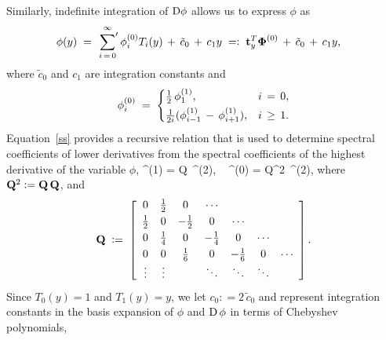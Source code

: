 \documentclass[%
secnumarabic,%
 amssymb, amsmath,%
 aps,prf,superscriptaddress,longbibliography
frontmatterverbose,
]{revtex4-2}
\newcommand{\DefinedAs}[0]{\mathrel{\mathop:}=}
\newcommand{\AsDefined}[0]{=\mathrel{\mathop:}}
\begin{document}
Similarly, indefinite integration of $\mathrm D \phi$ allows us to express $\phi$ as
	\begin{align*}
  	\phi (y) 
	\;&=\; 
	\sideset{}{'}\sum_{i \, = \, 0}^{\infty} 
	\phi_i^{(0)} T_i(y) \,+ \, \tilde{c}_0 \, + \,c_1 y
	 \; \AsDefined \;
	  \HH t_y^T \BB \Phi^{(0)} 
	  \,+\, 
	 \tilde{c}_0 \, + \,c_1 y,
\end{align*}
where $\tilde{c}_0$ and $c_1$ are integration constants and 
\begin{equation}
  \phi_i^{(0)} \;=\;
  \begin{cases}
    \tfrac{1}{2} \, \phi_1^{(1)}, & i \, = \, 0,
    \\[0.1cm]
  \tfrac{1}{2i} (\phi_{i-1}^{(1)}\,-\,\phi_{i+1}^{(1)}), &  i \, \geq \, 1.
  \end{cases}
  \nonumber
  \end{equation}
Equation~\eqref{ss} provides a recursive relation that is used to determine spectral coefficients of lower derivatives from the spectral coefficients of the highest derivative of the variable $\phi$,
	\be
	\BB \Phi^{(1)}
	\; = \;
	\HH Q \,\BB \Phi^{(2)},
	~
	\BB \Phi^{(0)}
	\; = \;
	\HH Q^2\, \BB \Phi^{(2)},
	\non
	\ee
where $\HH Q^2 \DefinedAs \HH Q\, \HH Q$, and
\begin{equation}\label{eq:Q}
  \HH Q \;\DefinedAs\; \left[\begin{array}{ccccccc}
     0& \tfrac{1}{2} & 0 & \cdots
     \\[0.1cm]
    \tfrac{1}{2} & 0 & -\tfrac{1}{2} & 0 &\cdots
    \\[0.1cm]
    0 & \tfrac{1}{4} & 0 & -\tfrac{1}{4} & 0 &\cdots 
    \\[0.1cm]
    0 & 0 & \tfrac{1}{6} & 0 & -\tfrac{1}{6} & 0 &\cdots 
    \\[0.cm]
    \vdots & \vdots &  & \ddots & \ddots & \ddots & \\[0.cm]
  \end{array}\right].
\end{equation}
Since $T_0(y) = 1$ and $T_1(y) = y$, we let $c_0 \DefinedAs 2 \,\tilde{c}_0$ and represent integration constants in the basis expansion of $\phi$ and $\mathrm D \, \phi$ in terms of Chebyshev polynomials,
\end{document}
